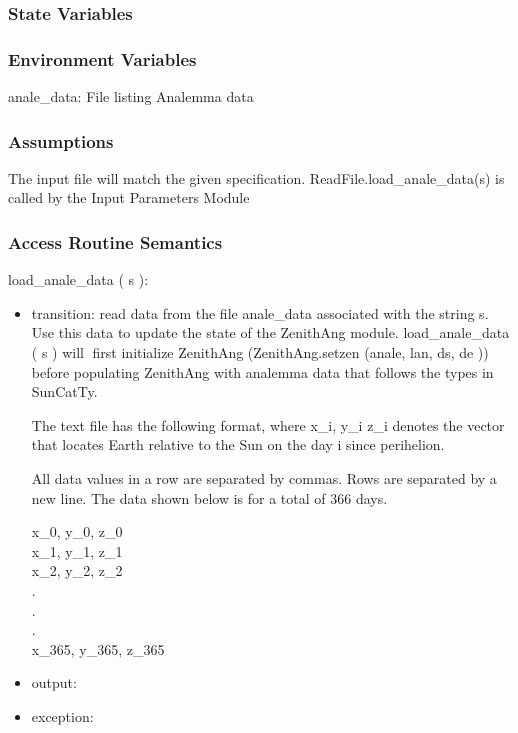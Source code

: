 \documentclass[12pt, titlepage]{article}
\begin{document}
\subsubsection{State Variables}



\subsubsection{Environment Variables}

anale\_data: File listing Analemma data


\subsubsection{Assumptions}
The input file will match the given specification.
ReadFile.load\_anale\_data(s) is called by the Input Parameters Module

\subsubsection{ Access Routine Semantics}


\noindent  load\_anale\_data ( s ):
\begin{itemize}
\item transition: read data from the file anale\_data associated with the string s. Use
this data to update the state of the ZenithAng module. load\_anale\_data ( s ) will first initialize ZenithAng (ZenithAng.setzen (anale, lan, ds, de )) before populating ZenithAng with analemma data that follows the types in SunCatTy.

The text file has the following format, where x\_i, y\_i z\_i denotes the vector that locates
Earth relative to the Sun on the day i since perihelion.

All data values in a row are separated by commas. Rows are separated by a new line. The data shown below is for a total of 366 days.
\begin{center}
x\_0,   y\_0,   z\_0\\
x\_1,   y\_1,   z\_1\\
x\_2,   y\_2,   z\_2\\
.\\
.\\
.\\
x\_365,   y\_365,   z\_365\\
\end{center}
\item output: 
\item exception: 
\end{itemize}
 
\end{document}
